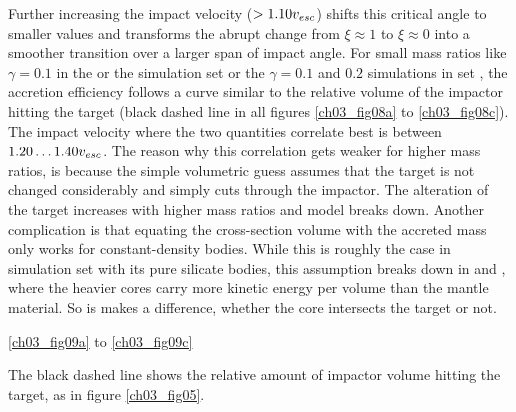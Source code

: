 Further increasing the impact velocity ($> 1.10 v_{esc}$) shifts this critical angle to smaller values and transforms the abrupt change from $\xi \approx 1$ to $\xi \approx 0$ into a smoother transition over a larger span of impact angle. For small mass ratios like $\gamma = 0.1$ in the \css or the simulation set or the $\gamma = 0.1$ and $0.2$ simulations in set \rss, the accretion efficiency follows a curve similar to the relative volume of the impactor hitting the target (black dashed line in all figures \ref{ch03_fig08a} to \ref{ch03_fig08c}). The impact velocity where the two quantities correlate best is between $1.20 \dots 1.40 v_{esc}$. The reason why this correlation gets weaker for higher mass ratios, is because the simple volumetric guess assumes that the target is not changed considerably and simply cuts through the impactor. The alteration of the target increases with higher mass ratios and model breaks down. Another complication is that equating the cross-section volume with the accreted mass only works for constant-density bodies. While this is roughly the case in simulation set \rss with its pure silicate bodies, this assumption breaks down in \css and \iss, where the heavier cores carry more kinetic energy per volume than the mantle material. So is makes a difference, whether the core intersects the target or not.



\ref{ch03_fig09a} to \ref{ch03_fig09c}

The black dashed line shows the relative amount of impactor volume hitting the target, as in figure \ref{ch03_fig05}.



